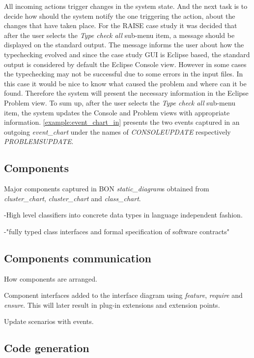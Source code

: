 \documentclass[conference]{IEEEtran}
\begin{document}
All incoming actions trigger changes in the system state. And the
next task is to decide how should the system notify the one triggering the
action, about the changes that have taken place. For the RAISE case
study it was decided that after the user selects the \emph{Type check
all} sub-menu item, a message should be displayed on the standard output.
The message informs the user about how the typechecking evolved and
since the case study GUI is Eclipse based, the standard output is considered by
default the Eclipse Console view. However in some cases the
typechecking may not be successful due to some errors in the input
files. In this case it would be nice to know what caused the problem
and where can it be found. Therefore the system will present the
necessary information in the Eclipse Problem view. To sum up, after the
user selects the \emph{Type check all} sub-menu item, the system updates the
Console and Problem views with appropriate information.
\autoref{example:event_chart_in} presents the two events captured in
an outgoing \emph{event\_chart} under the names of
\emph{CONSOLEUPDATE} respectively \emph{PROBLEMSUPDATE}.


%
\subsection{Components}
\label{sec:components}

Major components captured in BON \emph{static\_diagram}s obtained from
\emph{cluster\_chart}, \emph{cluster\_chart} and \emph{class\_chart}.

-High level classifiers into concrete data types in language
independent fashion.

-"fully typed class interfaces and formal specification of software contracts"

%
\subsection{Components communication}
\label{sec:comp-comm}

How components are arranged.

Component interfaces added to the interface diagram using
\emph{feature}, \emph{require} and \emph{ensure}. This will later
result in plug-in extensions and extension points.

Update scenarios with events.

%
\subsection{Code generation}
\label{sec:code-generation}
\end{document}
